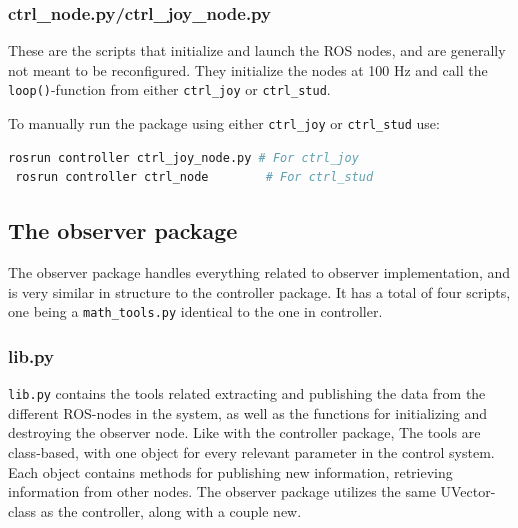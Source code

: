 \subsubsection{ctrl\_node.py/ctrl\_joy\_node.py}
These are the scripts that initialize and launch the ROS nodes, and are generally not meant to be reconfigured. They initialize the nodes at 100 Hz and call the \lstinline{loop()}-function from either \lstinline{ctrl_joy} or \lstinline{ctrl_stud}.

To manually run the package using either \lstinline{ctrl_joy} or \lstinline{ctrl_stud} use:

 \begin{lstlisting}[language=python,basicstyle=\mlttfamily, breaklines=true]
 rosrun controller ctrl_joy_node.py # For ctrl_joy
 rosrun controller ctrl_node        # For ctrl_stud
 \end{lstlisting}

\subsection{The observer package}

The observer package handles everything related to observer implementation, and is very similar in structure to the controller package. It has a total of four scripts, one being a \lstinline{math_tools.py} identical to the one in controller.

\subsubsection{lib.py}

\lstinline{lib.py} contains the tools related extracting and publishing the data from the different ROS-nodes in the system, as well as the functions for initializing and destroying the observer node. Like with the controller package, The tools are class-based, with one object for every relevant parameter in the control system. Each object contains methods for publishing new information, retrieving information from other nodes. The observer package utilizes the same UVector-class as the controller, along with a couple new.

